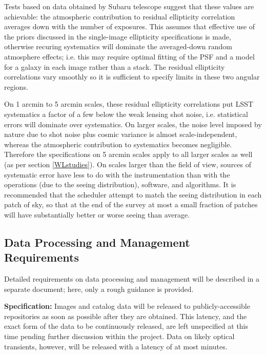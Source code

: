 Tests based on data obtained by Subaru telescope suggest that
these values are achievable: the atmospheric contribution to residual
ellipticity correlation averages down with the number of exposures. This
assumes that effective use of the priors discussed
in the single-image ellipticity specifications is made, otherwise recuring
systematics will dominate the averaged-down random atmosphere effects; i.e.
this may require optimal fitting of the PSF and a model for a galaxy in each
image rather than a stack. The residual ellipticity correlations
vary smoothly so it is sufficient to specify limits in these two angular
regions.

On 1 arcmin to 5 arcmin scales, these residual
ellipticity correlations put LSST systematics a factor of a few below the
weak lensing shot noise, i.e. statistical errors will dominate over systematics.
On larger scales, the noise level imposed by nature due to shot noise plus
cosmic variance is almost scale-independent, whereas the atmospheric
contribution to systematics becomes negligible.  Therefore the
specifications on 5 arcmin scales apply to all larger scales as well
(as per section \ref{WLstudies}).  On scales larger than the field of view, sources of
systematic error have less to do with the instrumentation than with the operations
(due to the seeing distribution), software, and algorithms.  It is recommended
that the scheduler attempt to match the seeing distribution in each
patch of sky, so that at the end of the survey at most a small fraction
of patches will have substantially better or worse seeing than average.



\subsection{Data Processing and Management Requirements}

Detailed requirements on data processing and management will be described
in a separate document; here, only a rough guidance is provided.

{\bf Specification:} Images and catalog data will be released to
publicly-accessible repositories as soon as possible after they are
obtained. This latency, and the exact form of the data to be continuously
released, are left unspecified at this time pending further discussion
within the project. Data on likely optical transients, however, will be
released with a latency of at most
minutes.

